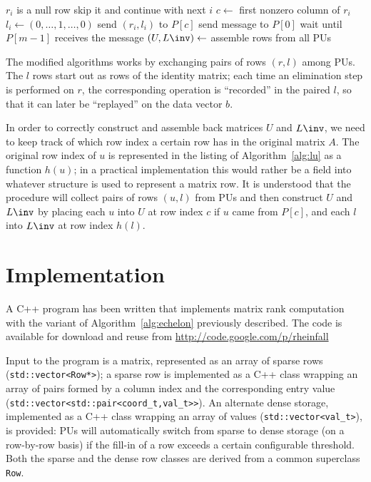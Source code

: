 \begin{Algorithm}
\begin{codebox}
    \li \Do
    \li   \If $r_i$ is a null row 
    \li   \Then
            skip it and continue with next $i$
          \End %
    \li   $c \gets$ first nonzero column of $r_i$
    \li   $l_i \gets (0, \ldots, 1, \ldots, 0)$
    \li   send $(r_i, l_i)$ to $P[c]$                    \label{li:lumaster:read2}
        \End %
    \li send  message to $P[0]$            \label{li:lumaster:core1}
    \li wait until $P[m-1]$ receives the  message
                                                      \label{li:lumaster:core2}
    \li $(U, L\inv) \gets$ assemble  rows from all PUs
                                                      \label{li:lumaster:result}
    \li \Return {}                           \label{li:lumaster:end}
  \end{codebox}
\end{Algorithm}

The modified algorithms works by exchanging pairs of rows $(r,l)$
among PUs.  The $l$ rows start out as rows of the identity matrix;
each time an elimination step is performed on $r$, the corresponding
operation is ``recorded'' in the paired $l$, so that it can later be
``replayed'' on the data vector $b$.

In order to correctly construct and assemble back matrices $U$ and
$L\inv$, we need to keep track of which row index a certain row has in
the original matrix $A$.  The original row index of $u$ is represented
in the listing of Algorithm~\ref{alg:lu} as a function $h(u)$; in a
practical implementation this would rather be a field into whatever
structure is used to represent a matrix row. It is understood that
the  procedure will collect pairs of rows $(u,l)$
from PUs and then construct $U$ and $L\inv$ by placing each $u$ into
$U$ at row index $c$ if $u$ came from $P[c]$,  and each $l$ into
$L\inv$ at row index $h(l)$.


\section{Implementation}
\label{sec:impl}

A C++ program has been written that implements matrix rank computation with
the variant of Algorithm~\ref{alg:echelon} previously described.  The
code is available for download and reuse from
\url{http://code.google.com/p/rheinfall}

Input to the program is a matrix, represented as an array of sparse
rows (\verb"std::vector<Row*>"); a sparse row is implemented as a C++
class wrapping an array of pairs formed by a column index and the
corresponding entry value
(\verb"std::vector<std::pair<coord_t,val_t>>").  An alternate dense
storage, implemented as a C++ class wrapping an array of values
(\verb"std::vector<val_t>"), is provided: PUs will automatically
switch from sparse to dense storage (on a row-by-row basis) if the
fill-in of a row exceeds a certain configurable threshold.  Both the
sparse and the dense row classes are derived from a common superclass
\verb"Row".

